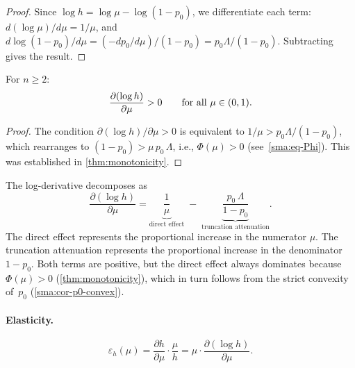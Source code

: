 \begin{proof}
  Since $\log h = \log\mu - \log(1-p_0)$, we differentiate each term:
  $d(\log\mu)/d\mu = 1/\mu$, and
  $d\log(1-p_0)/d\mu = (-dp_0/d\mu)/(1-p_0) = p_0\Lambda/(1-p_0)$.
  Subtracting gives the result.
\end{proof}

\begin{theorem}
  \label{sma:thm-logh-increasing}
  For $n \ge 2$:
  \begin{equation}\label{sma:eq-logh-increasing}
    \frac{\partial(\log h)}{\partial\mu} > 0
    \qquad\textup{for all } \mu \in (0,1).
  \end{equation}
\end{theorem}

\begin{proof}
  The condition $\partial(\log h)/\partial\mu > 0$ is equivalent to
  $1/\mu > p_0\Lambda/(1-p_0)$, which rearranges to
  $(1-p_0) > \mu\,p_0\,\Lambda$, i.e.,
  $\Phi(\mu) > 0$ (see~\eqref{sma:eq-Phi}). This was established in
  \cref{thm:monotonicity}.
\end{proof}

\begin{remark}
  \label{sma:rem-logderiv-decomp}
  The log-derivative decomposes as
  \[
    \frac{\partial(\log h)}{\partial\mu}
    = \underbrace{\frac{1}{\mu}}_{\text{direct effect}}
    \;-\;
    \underbrace{\frac{p_0\,\Lambda}{1-p_0}}_{\text{truncation attenuation}}.
  \]
  The direct effect represents the proportional increase in the numerator
  $\mu$. The truncation attenuation represents the proportional increase
  in the denominator $1-p_0$. Both terms are positive, but the direct
  effect always dominates because $\Phi(\mu) > 0$
  (\cref{thm:monotonicity}), which in turn follows from the strict
  convexity of~$p_0$ (\cref{sma:cor-p0-convex}).
\end{remark}


\paragraph{Elasticity.}

\begin{definition}
  \label{sma:def-elasticity}
  \begin{equation}\label{sma:eq-elasticity-def}
    \varepsilon_h(\mu)
    = \frac{\partial h}{\partial\mu}\cdot\frac{\mu}{h}
    = \mu\cdot\frac{\partial(\log h)}{\partial\mu}.
  \end{equation}
\end{definition}

